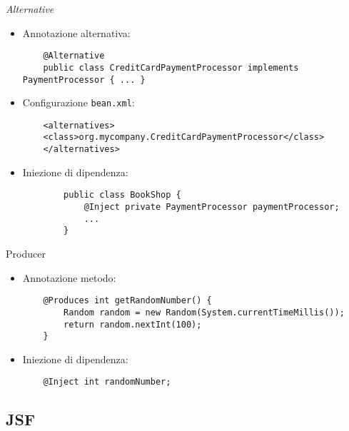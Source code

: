 \begin{frame}[fragile]{\textsl{Alternative}}

\begin{itemize}
\item Annotazione alternativa:
	\begin{lstlisting}
	@Alternative
	public class CreditCardPaymentProcessor implements PaymentProcessor { ... }
	\end{lstlisting}


\item Configurazione \texttt{bean.xml}:
	\begin{lstlisting}
	<alternatives>
	<class>org.mycompany.CreditCardPaymentProcessor</class>
	</alternatives>
	\end{lstlisting}

\item Iniezione di dipendenza:
	\begin{lstlisting}
		public class BookShop {
		    @Inject private PaymentProcessor paymentProcessor;
		    ...
		}
	\end{lstlisting}

\end{itemize}


\end{frame}





\begin{frame}[fragile]{Producer}

\begin{itemize}
\item Annotazione metodo:
	\begin{lstlisting}
	@Produces int getRandomNumber() {
	    Random random = new Random(System.currentTimeMillis());
	    return random.nextInt(100);
	}
	\end{lstlisting}


\item Iniezione di dipendenza:
	\begin{lstlisting}
	@Inject int randomNumber;
	\end{lstlisting}

\end{itemize}

\end{frame}



\subsection{JSF}

